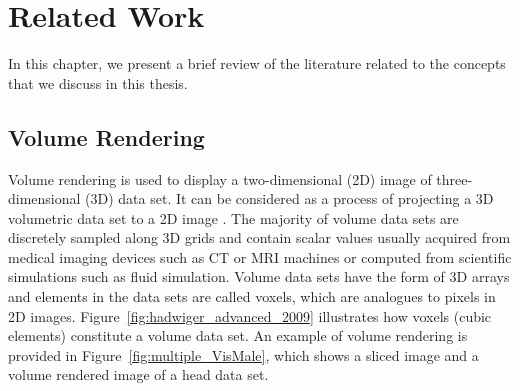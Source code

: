 \chapter{Related Work \label{related_work_chapter}}
In this chapter, we present a brief review of the literature related to the concepts that we discuss in this thesis.

\section{Volume Rendering \label{volume_rendering}}

Volume rendering is used to display a two-dimensional (2D) image of three-dimensional (3D) data set. It can be considered as a process of projecting a 3D volumetric data set to a 2D image \cite{garcia_parallel_2006}.
The majority of volume data sets are discretely sampled along 3D grids and contain scalar values usually acquired from medical imaging devices such as CT or MRI machines or computed from scientific simulations such as fluid simulation.
Volume data sets have the form of 3D arrays and elements in the data sets are called voxels, which are analogues to pixels in 2D images.
Figure~\ref{fig:hadwiger_advanced_2009} illustrates how voxels (cubic elements) constitute a volume data set.
An example of volume rendering is provided in Figure~\ref{fig:multiple_VisMale}, which shows a sliced image and a volume rendered image of a head data set.

